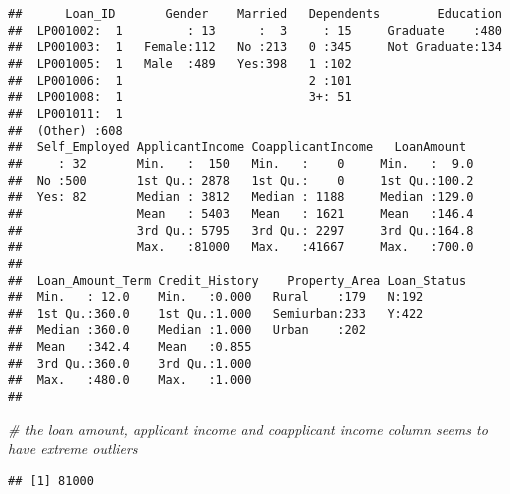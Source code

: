 \documentclass[
]{article}
\newenvironment{Shaded}{\begin{snugshade}}{\end{snugshade}}
\newcommand{\CommentTok}[1]{\textcolor[rgb]{0.56,0.35,0.01}{\textit{#1}}}
\newcommand{\FunctionTok}[1]{\textcolor[rgb]{0.00,0.00,0.00}{#1}}
\newcommand{\NormalTok}[1]{#1}
\newcommand{\SpecialCharTok}[1]{\textcolor[rgb]{0.00,0.00,0.00}{#1}}
\begin{document}
\begin{verbatim}
##      Loan_ID       Gender    Married   Dependents        Education  
##  LP001002:  1         : 13      :  3     : 15     Graduate    :480  
##  LP001003:  1   Female:112   No :213   0 :345     Not Graduate:134  
##  LP001005:  1   Male  :489   Yes:398   1 :102                       
##  LP001006:  1                          2 :101                       
##  LP001008:  1                          3+: 51                       
##  LP001011:  1                                                       
##  (Other) :608                                                       
##  Self_Employed ApplicantIncome CoapplicantIncome   LoanAmount   
##     : 32       Min.   :  150   Min.   :    0     Min.   :  9.0  
##  No :500       1st Qu.: 2878   1st Qu.:    0     1st Qu.:100.2  
##  Yes: 82       Median : 3812   Median : 1188     Median :129.0  
##                Mean   : 5403   Mean   : 1621     Mean   :146.4  
##                3rd Qu.: 5795   3rd Qu.: 2297     3rd Qu.:164.8  
##                Max.   :81000   Max.   :41667     Max.   :700.0  
##                                                                 
##  Loan_Amount_Term Credit_History    Property_Area Loan_Status
##  Min.   : 12.0    Min.   :0.000   Rural    :179   N:192      
##  1st Qu.:360.0    1st Qu.:1.000   Semiurban:233   Y:422      
##  Median :360.0    Median :1.000   Urban    :202              
##  Mean   :342.4    Mean   :0.855                              
##  3rd Qu.:360.0    3rd Qu.:1.000                              
##  Max.   :480.0    Max.   :1.000                              
## 
\end{verbatim}

\begin{Shaded}
\begin{Highlighting}[]
\CommentTok{\# the loan amount, applicant income and coapplicant income column seems to have extreme outliers}
\end{Highlighting}
\end{Shaded}

\begin{Shaded}
\end{Shaded}

\begin{verbatim}
## [1] 81000
\end{verbatim}
\end{document}
